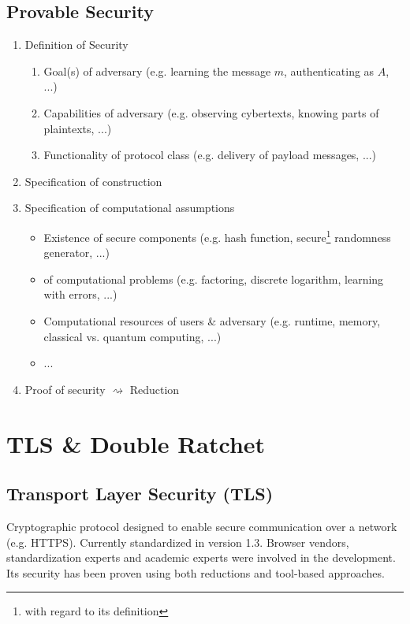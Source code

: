 \documentclass[11pt,a4paper,headinclude,twoside, open=right,numbers=noenddot]{scrreprt}
\begin{document}
\subsection{Provable Security}
\begin{enumerate}
\item Definition of Security
\begin{enumerate}
\item Goal(s) of adversary (e.g. learning the message $m$, authenticating as $A$, ...)
\item Capabilities of adversary (e.g. observing cybertexts, knowing parts of plaintexts, ...)
\item Functionality of protocol class (e.g. delivery of payload messages, ...)
\end{enumerate}
\item Specification of construction
\item Specification of computational assumptions
\begin{itemize}
\item Existence of secure components (e.g. hash function, secure\footnote{with regard to its definition} randomness generator, ...)
\item  of computational problems (e.g. factoring, discrete logarithm, learning with errors, ...)
\item Computational resources of users \& adversary (e.g. runtime, memory, classical vs. quantum computing, ...)
\item ...
\end{itemize}
\item Proof of security $\rightsquigarrow$ Reduction
\end{enumerate}

\section{TLS \& Double Ratchet}
\label{sec:tls_double_ratchet}

\subsection{Transport Layer Security (TLS)}
\label{ssec:tls}
Cryptographic protocol designed to enable secure communication over a network (e.g. HTTPS).
Currently standardized  in version 1.3.
Browser vendors, standardization experts and academic experts were involved in the development.
Its security has been proven using both reductions and tool-based approaches.
\end{document}
